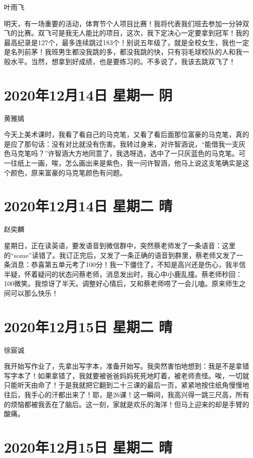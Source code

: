 叶雨飞

明天，有一场重要的活动，体育节个人项目比赛！我将代表我们班去参加一分钟双飞的比赛。双飞可是我无人能比的项目，这次，我下定决心一定要拿到冠军！我的最高纪录是127个，最多连续跳过183个！别说五年级了，就是全校女生，我也一定是名列前茅！我班男生都没我跳的多，都没我跳的快，只有羽毛球校队的人和我一般水平。当然，想拿到好成绩，也是要练习的。不多说了，我该去跳双飞了！

\section{2020年12月14日 星期一 阴}

黄雅嫣

今天上美术课时，我看了看自己的马克笔，又看了看后面那位富豪的马克笔，真的是应了那句话：没有对比就没有伤害。我转过身来，对许智涵说，“能借我一支灰色马克笔吗？”许智涵大方地同意了，我选呀选，选中了一只灰蓝色的马克笔。可一往纸上一画，唉，怎么画出来是紫色，我一问许智涵，他马上说这支笔确实是这个颜色，原来富豪的马克笔颜色有问题。

\section{2020年12月14日 星期二 晴}

赵奕麟

星期日，正在读英语，要发语音到微信群中，突然蔡老师发了一条语音：这里的“some”读错了。我订正完后，又发了一条正确的语音到群里，蔡老师又发了一条消息：恭喜第五单元考了100分！我一下僵住了，不知是高兴还是伤心，我半信半疑，怀着疑问的状态问蔡老师，消息发出时，我心中小鹿乱撞。蔡老师秒回：100微笑。我惊讶了半天。调整好心情后，又和蔡老师唠了一会儿嗑。原来师生之间可以那么快乐！

\section{2020年12月15日 星期二 晴}

徐宸诚

我开始写作业了，先拿出写字本，准备开始写。我突然害怕地想到：我是不是拿错写字本了！如果拿错了，我就要被爸爸妈妈死死地盯着，被老师责怪。唉，一切就只能听天由命了！于是我就把它翻到二十三课的最后一页，紧紧地按住纸角慢慢地往后，我手心的汗都出来了！耶，是26课！这一瞬间，我高兴得一跳三尺高，所有的烦恼都被我丢在了脑后。这一刻，家就是欢乐的海洋！但马上迎来的却是手臂的酸痛。

\section{2020年12月15日 星期二 晴}

